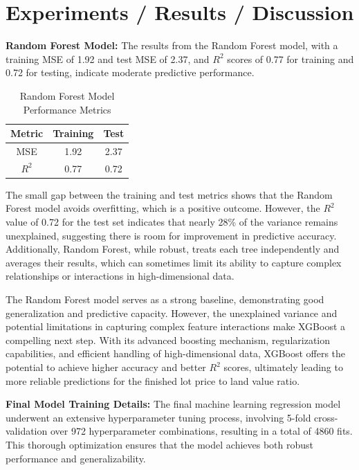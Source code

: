 \section{Experiments / Results / Discussion}

\textbf{Random Forest Model:} The results from the Random Forest model, with a training
MSE of 1.92 and test MSE of 2.37, and $R^{2}$ scores of 0.77 for training and
0.72 for testing, indicate moderate predictive performance.

\begin{table}[h!]
	\centering
	\caption{Random Forest Model Performance Metrics}
	\renewcommand{\arraystretch}{1} %
	\setlength{\tabcolsep}{10pt} %
	\begin{tabular}{|c|c|c|}
		\hline
		\textbf{Metric} & \textbf{Training} & \textbf{Test} \\
		\hline
		MSE             & 1.92              & 2.37          \\
		\hline
		$R^{2}$         & 0.77              & 0.72          \\
		\hline
	\end{tabular}
\end{table}

The small gap between the training and test metrics shows that the Random Forest
model avoids overfitting, which is a positive outcome. However, the $R^{2}$ value
of 0.72 for the test set indicates that nearly 28\% of the variance remains
unexplained, suggesting there is room for improvement in predictive accuracy.
Additionally, Random Forest, while robust, treats each tree independently and averages
their results, which can sometimes limit its ability to capture complex
relationships or interactions in high-dimensional data.

The Random Forest model serves as a strong baseline, demonstrating good generalization
and predictive capacity. However, the unexplained variance and potential limitations
in capturing complex feature interactions make XGBoost a compelling next step.
With its advanced boosting mechanism, regularization capabilities, and efficient
handling of high-dimensional data, XGBoost offers the potential to achieve higher
accuracy and better $R^{2}$ scores, ultimately leading to more reliable
predictions for the finished lot price to land value ratio.

\textbf{Final Model Training Details:} The final machine learning regression model
underwent an extensive hyperparameter tuning process, involving 5-fold cross-validation
over 972 hyperparameter combinations, resulting in a total of 4860 fits. This
thorough optimization ensures that the model achieves both robust performance
and generalizability.

